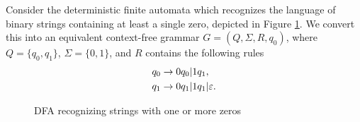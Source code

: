 \begin{exmp}
    Consider the deterministic finite automata which recognizes the language of binary strings containing at least a single zero, depicted in Figure \ref{fig:dfa-at-least-one-zero}. We convert this into an equivalent context-free grammar $G = (Q, \Sigma, R, q_0)$, where $Q = \{q_0, q_1\}$, $\Sigma = \{0, 1\}$, and $R$ contains the following rules
    \begin{align*}
        q_0 &\to 0q_0 | 1q_1, \\
        q_1 &\to 0q_1 | 1q_1 | \varepsilon.
    \end{align*}

    \begin{figure}
        \centering
        \caption{DFA recognizing strings with one or more zeros}
        \label{fig:dfa-at-least-one-zero}
    \end{figure}
\end{exmp}

